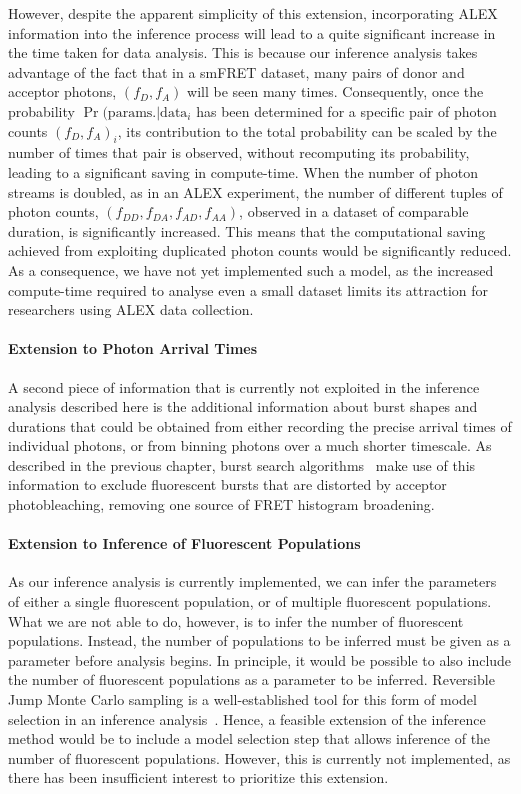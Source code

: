 However, despite the apparent simplicity of this extension, incorporating ALEX information into the inference process will lead to a quite significant increase in the time taken for data analysis. This is because our inference analysis takes advantage of the fact that in a smFRET dataset, many pairs of donor and acceptor photons, $(f_D, f_A)$ will be seen many times. Consequently, once the probability $\Pr(\text{params.}|\text{data}_i$ has been determined for a specific pair of photon counts $(f_D, f_A)_i$, its contribution to the total probability can be scaled by the number of times that pair is observed, without recomputing its probability, leading to a significant saving in compute-time. When the number of photon streams is doubled, as in an ALEX experiment, the number of different tuples of photon counts, $(f_{DD}, f_{DA}, f_{AD}, f_{AA})$, observed in a dataset of comparable duration, is significantly increased. This means that the computational saving achieved from exploiting duplicated photon counts would be significantly reduced. As a consequence, we have not yet implemented such a model, as the increased compute-time required to analyse even a small dataset limits its attraction for researchers using ALEX data collection.   

\paragraph{Extension to Photon Arrival Times}
A second piece of information that is currently not exploited in the inference analysis described here is the additional information about burst shapes and durations that could be obtained from either recording the precise arrival times of individual photons, or from binning photons over a much shorter timescale. As described in the previous chapter, burst search algorithms~\cite{nir06} make use of this information to exclude fluorescent bursts that are distorted by acceptor photobleaching, removing one source of FRET histogram broadening. 

\paragraph{Extension to Inference of Fluorescent Populations}
As our inference analysis is currently implemented, we can infer the parameters of either a single fluorescent population, or of multiple fluorescent populations. What we are not able to do, however, is to infer the number of fluorescent populations. Instead, the number of populations to be inferred must be given as a parameter before analysis begins. In principle, it would be possible to also include the number of fluorescent populations as a parameter to be inferred. Reversible Jump Monte Carlo sampling is a well-established tool for this form of model selection in an inference analysis~\cite{green1995}. Hence, a feasible extension of the inference method would be to include a model selection step that allows inference of the number of fluorescent populations. However, this is currently not implemented, as there has been insufficient interest to prioritize this extension. 

